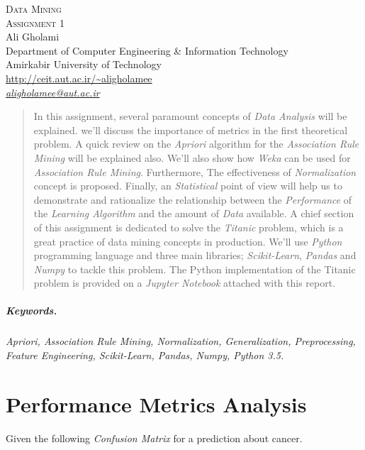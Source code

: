 \documentclass[12pt]{article}
\numberwithin{equation}{section}
\numberwithin{table}{section}
\numberwithin{figure}{section}
\begin{document}

\begin{center}
\textsc{\Huge Data Mining} \\[2pt]
	\textsc{\Large Assignment 1}\\
	\vspace{0.5cm}
  Ali Gholami \\[6pt]
  Department of Computer Engineering \& Information Technology\\
  Amirkabir University of Technology  \\[6pt]
  \def\UrlFont{\em}
  \url{http://ceit.aut.ac.ir/~aligholamee}\\
    \href{mailto:aligholamee@aut.ac.ir}{\textit{aligholamee@aut.ac.ir}}
\end{center}

\begin{abstract}
In this assignment, several paramount concepts of \textit{Data Analysis} will be explained. we'll discuss the importance of metrics in the first theoretical problem. A quick review on the \textit{Apriori} algorithm for the \textit{Association Rule Mining} will be explained also. We'll also show how \textit{Weka} can be used for \textit{Association Rule Mining}. Furthermore, The effectiveness of \textit{Normalization} concept is proposed. Finally, an \textit{Statistical} point of view will help us to demonstrate and rationalize the relationship between the \textit{Performance} of the \textit{Learning Algorithm} and the amount of \textit{Data} available. A chief section of this assignment is dedicated to solve the \textit{Titanic} problem, which is a great practice of data mining concepts in production. We'll use \textit{Python} programming language and three main libraries; \textit{Scikit-Learn}, \textit{Pandas} and \textit{Numpy} to tackle this problem. The Python implementation of the Titanic problem is provided on a \textit{Jupyter Notebook} attached with this report.
\end{abstract} 

\subparagraph{Keywords.} \textit{Apriori, Association Rule Mining, Normalization, Generalization, Preprocessing, Feature Engineering, Scikit-Learn, Pandas, Numpy, Python 3.5.}

\section{Performance Metrics Analysis}
Given the following \textit{Confusion Matrix} for a prediction about cancer.
\end{document}
